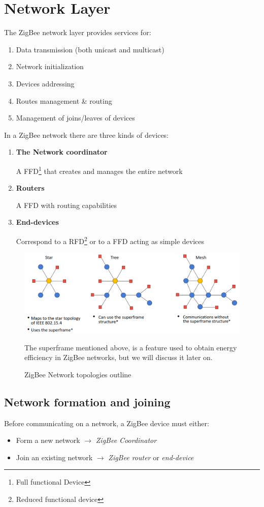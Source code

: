 \section{Network Layer}

The ZigBee network layer provides services for:
\begin{enumerate}
   \item Data transmission (both unicast and multicast)
   \item Network initialization
   \item Devices addressing
   \item Routes management \& routing
   \item Management of joins/leaves of devices
\end{enumerate}

In a ZigBee network there are three kinds of devices:
\begin{enumerate}
   \item \textbf{The Network coordinator}
      
   A FFD\footnote{Full functional Device} that creates and manages the entire network
   \item \textbf{Routers}
      
   A FFD with routing capabilities
   \item \textbf{End-devices}
   
   Correspond to a RFD\footnote{Reduced functional device} or to a FFD acting as simple devices
\end{enumerate}

\begin{figure}[htbp]
   \centering
   \includegraphics{images/zigbee_networktopologies.png}
   \caption{ZigBee Network topologies outline}
   \label{fig:zigbee_networktopologies}
   The superframe mentioned above, is a feature used to obtain energy efficiency in ZigBee networks, but we will discuss it later on.
\end{figure}

\subsection{Network formation and joining}
Before communicating on a network, a ZigBee device must either:
\begin{itemize}
   \item Form a new network $\longrightarrow$ \textit{ZigBee Coordinator}
   \item Join an existing network $\longrightarrow$ \textit{ZigBee router} or \textit{end-device}
\end{itemize}

